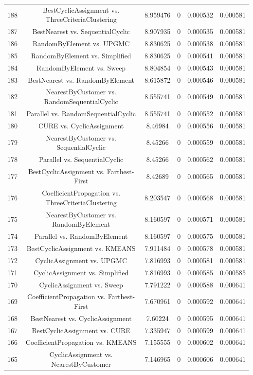 \documentclass[a4paper,10pt]{article}
\begin{document}
\begin{landscape}
\begin{table}[!htp]
\begin{tabular}{cccccc}
188&BestCyclicAssignment vs. ThreeCriteriaClustering&8.959476&0&0.000532&0.000581\\
187&BestNearest vs. SequentialCyclic&8.907935&0&0.000535&0.000581\\
186&RandomByElement vs. UPGMC&8.830625&0&0.000538&0.000581\\
185&RandomByElement vs. Simplified&8.830625&0&0.000541&0.000581\\
184&RandomByElement vs. Sweep&8.804854&0&0.000543&0.000581\\
183&BestNearest vs. RandomByElement&8.615872&0&0.000546&0.000581\\
182&NearestByCustomer vs. RandomSequentialCyclic&8.555741&0&0.000549&0.000581\\
181&Parallel vs. RandomSequentialCyclic&8.555741&0&0.000552&0.000581\\
180&CURE vs. CyclicAssignment&8.46984&0&0.000556&0.000581\\
179&NearestByCustomer vs. SequentialCyclic&8.45266&0&0.000559&0.000581\\
178&Parallel vs. SequentialCyclic&8.45266&0&0.000562&0.000581\\
177&BestCyclicAssignment vs. Farthest-First&8.42689&0&0.000565&0.000581\\
176&CoefficientPropagation vs. ThreeCriteriaClustering&8.203547&0&0.000568&0.000581\\
175&NearestByCustomer vs. RandomByElement&8.160597&0&0.000571&0.000581\\
174&Parallel vs. RandomByElement&8.160597&0&0.000575&0.000581\\
173&BestCyclicAssignment vs. KMEANS&7.911484&0&0.000578&0.000581\\
172&CyclicAssignment vs. UPGMC&7.816993&0&0.000581&0.000581\\
171&CyclicAssignment vs. Simplified&7.816993&0&0.000585&0.000585\\
170&CyclicAssignment vs. Sweep&7.791222&0&0.000588&0.000641\\
169&CoefficientPropagation vs. Farthest-First&7.670961&0&0.000592&0.000641\\
168&BestNearest vs. CyclicAssignment&7.60224&0&0.000595&0.000641\\
167&BestCyclicAssignment vs. CURE&7.335947&0&0.000599&0.000641\\
166&CoefficientPropagation vs. KMEANS&7.155555&0&0.000602&0.000641\\
165&CyclicAssignment vs. NearestByCustomer&7.146965&0&0.000606&0.000641\\

\end{tabular}
\end{table}
\end{landscape}
\end{document}
